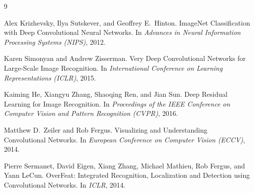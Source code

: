 \documentclass[12pt,a4paper]{article}
\begin{document}
\begin{thebibliography}{9}

Alex Krizhevsky, Ilya Sutskever, and Geoffrey E.\ Hinton.
\newblock ImageNet Classification with Deep Convolutional Neural Networks.
\newblock In \emph{Advances in Neural Information Processing Systems (NIPS)}, 2012.

Karen Simonyan and Andrew Zisserman.
\newblock Very Deep Convolutional Networks for Large-Scale Image Recognition.
\newblock In \emph{International Conference on Learning Representations (ICLR)}, 2015.

Kaiming He, Xiangyu Zhang, Shaoqing Ren, and Jian Sun.
\newblock Deep Residual Learning for Image Recognition.
\newblock In \emph{Proceedings of the IEEE Conference on Computer Vision and Pattern Recognition (CVPR)}, 2016.

Matthew D.\ Zeiler and Rob Fergus.
\newblock Visualizing and Understanding Convolutional Networks.
\newblock In \emph{European Conference on Computer Vision (ECCV)}, 2014.

Pierre Sermanet, David Eigen, Xiang Zhang, Michael Mathieu, Rob Fergus, and Yann LeCun.
\newblock OverFeat: Integrated Recognition, Localization and Detection using Convolutional Networks.
\newblock In \emph{ICLR}, 2014.

\end{thebibliography}
\end{document}
